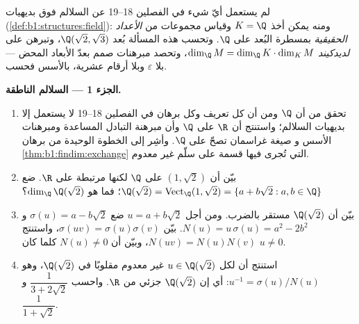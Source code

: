 \begin{problem}\label{pb:b1:findim:1}
لم يستعمل أيّ شيء في الفصلين 18--19 عن السلالم فوق
بديهيات  (\cref{def:b1:structures:field}): ومنه يمكن
أخذ $K = \Q$ وقياس مجموعات من \emph{الأعداد الحقيقية}
بمسطرة البُعد على $\Q$. وتحسب هذه المسألة
بُعد $\Q(\sqrt2, \sqrt3)$، وتبرهن على \emph{
لديدكيند} $\dim_\Q M = \dim_\Q K \cdot \dim_K M$، وتحصد
مبرهنات صمم بعدّ الأبعاد المحض --- بلا
$\varepsilon$ وبلا أرقام عشرية، بالأسس فحسب.

\medskip
\noindent\textbf{الجزء 1 --- السلالم الناطقة.}
\begin{enumerate}
  \item تحقق من أن $\Q$  ومن أن كل تعريف وكل
        برهان في الفصلين 18--19 لا يستعمل إلا بديهيات 
        السلالم؛ واستنتج أن $\R$  على $\Q$ وأن
        مبرهنة التبادل المساعدة ومبرهنات الأسس و
        صيغة غراسمان تصحّ على $\Q$. وأشِر إلى الخطوة الوحيدة
        من برهان \cref{thm:b1:findim:exchange} التي تُجرى فيها
        قسمة على سلّم غير معدوم.
  \item بيّن أن $(1, \sqrt2)$  على $\Q$ لكنها مرتبطة على
        $\R$. ضع $\Q(\sqrt2) = \operatorname{Vect}_\Q(1,
        \sqrt2) = \{a + b\sqrt2 : a, b \in \Q\}$؛ فما هو
        $\dim_\Q \Q(\sqrt2)$؟
  \item بيّن أن $\Q(\sqrt2)$ مستقر بالضرب.
        ومن أجل $u = a + b\sqrt2$ ضع $\sigma(u) = a - b\sqrt2$ و
        $N(u) = u\,\sigma(u) = a^2 - 2b^2$. بيّن $\sigma(uv) =
        \sigma(u)\sigma(v)$، واستنتج $N(uv) = N(u)N(v)$، وبيّن أن
        $N(u) \neq 0$ كلما كان $u \neq 0$.
  \item استنتج أن لكل $u \in \Q(\sqrt2)$ غير معدوم مقلوبًا
        في $\Q(\sqrt2)$، وهو $u^{-1} =
        \sigma(u)/N(u)$: أي إن $\Q(\sqrt2)$  جزئي من $\R$.
        واحسب $\dfrac1{3 + 2\sqrt2}$ و $\dfrac1{1 + \sqrt2}$.
\end{enumerate}


\end{problem}
